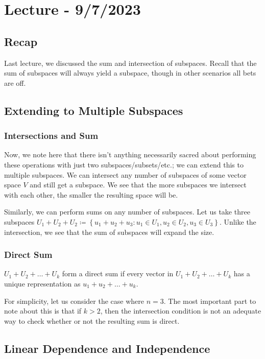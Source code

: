 \documentclass[openany]{book}
\begin{document}
	\section{Lecture - 9/7/2023}
	\subsection{Recap} Last lecture, we discussed the sum and intersection of subspaces. Recall that the sum of subspaces will always yield a subspace, though in other scenarios all bets are off.
	
	\subsection{Extending to Multiple Subspaces}
	\subsubsection{Intersections and Sum}
	Now, we note here that there isn't anything necessarily sacred about performing these operations with just two subspaces/subsets/etc.; we can extend this to multiple subspaces. We can intersect any number of subspaces of some vector space $V$ and still get a subspace. We see that the more subspaces we intersect with each other, the smaller the resulting space will be.
	
	Similarly, we can perform sums on any number of subspaces. Let us take three subspaces $U_{1} + U_{2} + U_{2} \coloneq \left\{  u_{1} + u_{2} + u_{3} : u_{1} \in U_{1}, u_{2} \in U_{2}, u_{3} \in U_{3}\right\}$. Unlike the intersection, we see that the sum of subspaces will expand the size.
	
	\subsubsection{Direct Sum}
	\begin{defn}
		$U_{1} + U_{2} + \ldots + U_{k}$ form a direct sum if every vector in $U_{1} + U_{2} + \ldots + U_{k}$ has a unique representation as $u_{1} + u_{2} + \ldots + u_{k}$.
	\end{defn}
	
	For simplicity, let us consider the case where $n=3$. The most important part to note about this is that if $k > 2$, then the intersection condition is not an adequate way to check whether or not the resulting sum is direct.
	
	\subsection{Linear Dependence and Independence}
\end{document}
